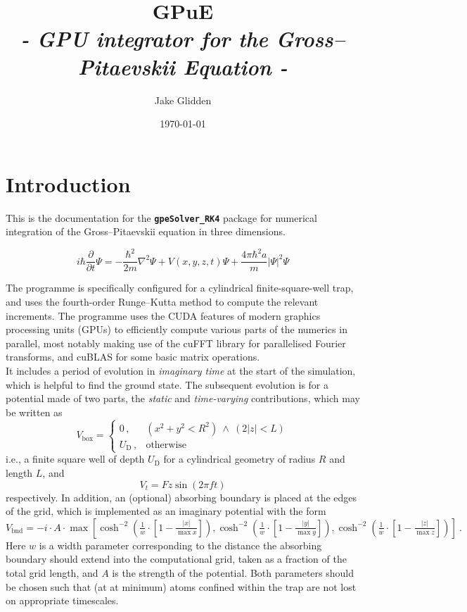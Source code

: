 \documentclass{jakedoc}
\title{GPuE\\[-0.25\baselineskip]{\small{}\emph{- GPU integrator for the Gross--Pitaevskii Equation -}}}
\author{Jake Glidden}
\date{\today}
\let\oldtexttt\texttt
\renewcommand\texttt[1]{\textbf{\oldtexttt{#1}}}
\begin{document}
\section{Introduction}

This is the documentation for the \texttt{gpeSolver\_RK4} package for numerical integration of the Gross--Pitaevskii equation in three dimensions.

\begin{equation}
i\hbar\frac{\partial}{\partial t}\Psi=-\frac{\hbar^2}{2m}\nabla^2\Psi+V(x,y,z,t)\Psi+\frac{4\pi\hbar^2a}{m}|\Psi|^2\Psi
\end{equation}

The programme is specifically configured for a cylindrical finite-square-well trap, and uses the fourth-order Runge--Kutta method to compute the relevant increments.
The programme uses the CUDA features of modern graphics processing units (GPUs) to efficiently compute various parts of the numerics in parallel, most notably making use of the cuFFT library for parallelised Fourier transforms, and cuBLAS for some basic matrix operations.\\

It includes a period of evolution in \emph{imaginary time} at the start of the simulation, which is helpful to find the ground state. The subsequent evolution is for a potential made of two parts, the \emph{static} and \emph{time-varying} contributions, which may be written as
\begin{equation}
V_{\text{box}}=\begin{cases}
	0\,,&(x^2+y^2<R^2)\ \land\ (2|z|<L)\\
	U_{\text{D}}\,,&\text{otherwise}
	\end{cases}\label{box}
\end{equation}
i.e., a finite square well of depth $U_{\text{D}}$ for a cylindrical geometry of radius $R$ and length $L$, and
\begin{equation}
V_{t}=F z \sin(2\pi f t)\label{drive}
\end{equation}
respectively. In addition, an (optional) absorbing boundary is placed at the edges of the grid, which is implemented as an imaginary potential with the form
\begin{equation}
V_{\text{bnd}}=-i\cdot A\cdot\max\left[
	\cosh^{-2}\left(\tfrac{1}{w}\cdot\left[1-\tfrac{|x|}{\max{x}}\right]\right), 
	\cosh^{-2}\left(\tfrac{1}{w}\cdot\left[1-\tfrac{|y|}{\max{y}}\right]\right), 
	\cosh^{-2}\left(\tfrac{1}{w}\cdot\left[1-\tfrac{|z|}{\max{z}}\right]\right)
\right]\ .\label{bnd}
\end{equation}
Here $w$ is a width parameter corresponding to the distance the absorbing boundary should extend into the computational grid, taken as a fraction of the total grid length, and $A$ is the strength of the potential. Both parameters should be chosen such that (at at minimum) atoms confined within the trap are not lost on appropriate timescales.\\
\end{document}
